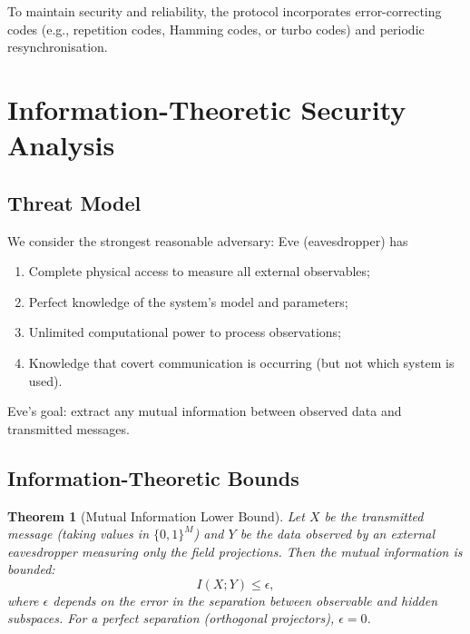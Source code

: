 \documentclass[11pt,twocolumn,a4paper]{article}
\newtheorem{theorem}{Theorem}[section]
\theoremstyle{definition}
\begin{document}
To maintain security and reliability, the protocol incorporates error-correcting codes (e.g., repetition codes, Hamming codes, or turbo codes) and periodic resynchronisation.

\section{Information-Theoretic Security Analysis}
\label{sec:security}

\subsection{Threat Model}

We consider the strongest reasonable adversary: Eve (eavesdropper) has

\begin{enumerate}[nosep]
\item Complete physical access to measure all external observables;
\item Perfect knowledge of the system's model and parameters;
\item Unlimited computational power to process observations;
\item Knowledge that covert communication is occurring (but not which system is used).
\end{enumerate}

Eve's goal: extract any mutual information between observed data and transmitted messages.

\subsection{Information-Theoretic Bounds}

\begin{theorem}[Mutual Information Lower Bound]
\label{thm:mutual-info}
Let $X$ be the transmitted message (taking values in $\{0,1\}^M$) and $Y$ be the data observed by an external eavesdropper measuring only the field projections. Then the mutual information is bounded:
\[
I(X; Y) \leq \epsilon,
\]
where $\epsilon$ depends on the error in the separation between observable and hidden subspaces. For a perfect separation (orthogonal projectors), $\epsilon = 0$.
\end{theorem}
\end{document}
